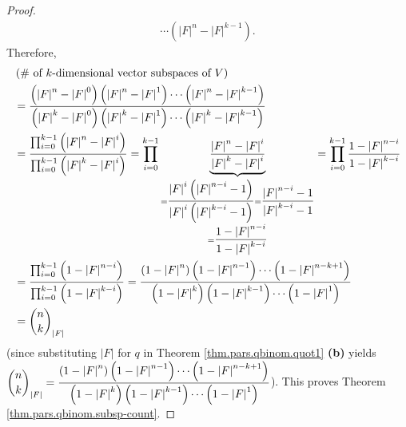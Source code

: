 \begin{proof}
\begin{align*}
\cdots\left(  \left\vert F\right\vert ^{n}-\left\vert F\right\vert
^{k-1}\right)  .
\end{align*}
Therefore,%
\begin{align*}
&  \left(  \text{\# of }k\text{-dimensional vector subspaces of }V\right) \\
&  =\dfrac{\left(  \left\vert F\right\vert ^{n}-\left\vert F\right\vert
^{0}\right)  \left(  \left\vert F\right\vert ^{n}-\left\vert F\right\vert
^{1}\right)  \cdots\left(  \left\vert F\right\vert ^{n}-\left\vert
F\right\vert ^{k-1}\right)  }{\left(  \left\vert F\right\vert ^{k}-\left\vert
F\right\vert ^{0}\right)  \left(  \left\vert F\right\vert ^{k}-\left\vert
F\right\vert ^{1}\right)  \cdots\left(  \left\vert F\right\vert ^{k}%
-\left\vert F\right\vert ^{k-1}\right)  }\\
&  =\dfrac{\prod_{i=0}^{k-1}\left(  \left\vert F\right\vert ^{n}-\left\vert
F\right\vert ^{i}\right)  }{\prod_{i=0}^{k-1}\left(  \left\vert F\right\vert
^{k}-\left\vert F\right\vert ^{i}\right)  }=\prod_{i=0}^{k-1}%
\underbrace{\dfrac{\left\vert F\right\vert ^{n}-\left\vert F\right\vert ^{i}%
}{\left\vert F\right\vert ^{k}-\left\vert F\right\vert ^{i}}}%
_{\substack{=\dfrac{\left\vert F\right\vert ^{i}\left(  \left\vert
F\right\vert ^{n-i}-1\right)  }{\left\vert F\right\vert ^{i}\left(  \left\vert
F\right\vert ^{k-i}-1\right)  }=\dfrac{\left\vert F\right\vert ^{n-i}%
-1}{\left\vert F\right\vert ^{k-i}-1}\\=\dfrac{1-\left\vert F\right\vert
^{n-i}}{1-\left\vert F\right\vert ^{k-i}}}}=\prod_{i=0}^{k-1}\dfrac
{1-\left\vert F\right\vert ^{n-i}}{1-\left\vert F\right\vert ^{k-i}}\\
&  =\dfrac{\prod_{i=0}^{k-1}\left(  1-\left\vert F\right\vert ^{n-i}\right)
}{\prod_{i=0}^{k-1}\left(  1-\left\vert F\right\vert ^{k-i}\right)  }%
=\dfrac{\left(  1-\left\vert F\right\vert ^{n}\right)  \left(  1-\left\vert
F\right\vert ^{n-1}\right)  \cdots\left(  1-\left\vert F\right\vert
^{n-k+1}\right)  }{\left(  1-\left\vert F\right\vert ^{k}\right)  \left(
1-\left\vert F\right\vert ^{k-1}\right)  \cdots\left(  1-\left\vert
F\right\vert ^{1}\right)  }\\
&  =\dbinom{n}{k}_{\left\vert F\right\vert }%
\end{align*}
(since substituting $\left\vert F\right\vert $ for $q$ in Theorem
\ref{thm.pars.qbinom.quot1} \textbf{(b)} yields \newline$\dbinom{n}%
{k}_{\left\vert F\right\vert }=\dfrac{\left(  1-\left\vert F\right\vert
^{n}\right)  \left(  1-\left\vert F\right\vert ^{n-1}\right)  \cdots\left(
1-\left\vert F\right\vert ^{n-k+1}\right)  }{\left(  1-\left\vert F\right\vert
^{k}\right)  \left(  1-\left\vert F\right\vert ^{k-1}\right)  \cdots\left(
1-\left\vert F\right\vert ^{1}\right)  }$). This proves Theorem
\ref{thm.pars.qbinom.subsp-count}.
\end{proof}

